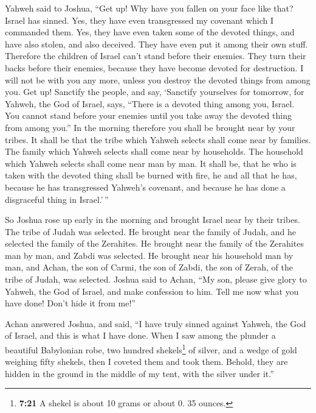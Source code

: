 Yahweh said to Joshua, ``Get up! Why have you fallen on
your face like that?  Israel has sinned. Yes, they have
even transgressed my covenant which I commanded them. Yes, they have
even taken some of the devoted things, and have also stolen, and also
deceived. They have even put it among their own stuff. 
Therefore the children of Israel can't stand before their enemies. They
turn their backs before their enemies, because they have become devoted
for destruction. I will not be with you any more, unless you destroy the
devoted things from among you.  Get up! Sanctify the
people, and say, `Sanctify yourselves for tomorrow, for Yahweh, the God
of Israel, says, ``There is a devoted thing among you, Israel. You
cannot stand before your enemies until you take away the devoted thing
from among you.''  In the morning therefore you shall be
brought near by your tribes. It shall be that the tribe which Yahweh
selects shall come near by families. The family which Yahweh selects
shall come near by households. The household which Yahweh selects shall
come near man by man.  It shall be, that he who is taken
with the devoted thing shall be burned with fire, he and all that he
has, because he has transgressed Yahweh's covenant, and because he has
done a disgraceful thing in Israel.'\,''

 So Joshua rose up early in the morning and brought
Israel near by their tribes. The tribe of Judah was selected.
 He brought near the family of Judah, and he selected the
family of the Zerahites. He brought near the family of the Zerahites man
by man, and Zabdi was selected.  He brought near his
household man by man, and Achan, the son of Carmi, the son of Zabdi, the
son of Zerah, of the tribe of Judah, was selected. 
Joshua said to Achan, ``My son, please give glory to Yahweh, the God of
Israel, and make confession to him. Tell me now what you have done!
Don't hide it from me!''

 Achan answered Joshua, and said, ``I have truly sinned
against Yahweh, the God of Israel, and this is what I have done.
 When I saw among the plunder a beautiful Babylonian
robe, two hundred shekels\footnote{\textbf{7:21} A shekel is about 10
  grams or about 0. 35 ounces.} of silver, and a wedge of gold weighing
fifty shekels, then I coveted them and took them. Behold, they are
hidden in the ground in the middle of my tent, with the silver under
it.''


